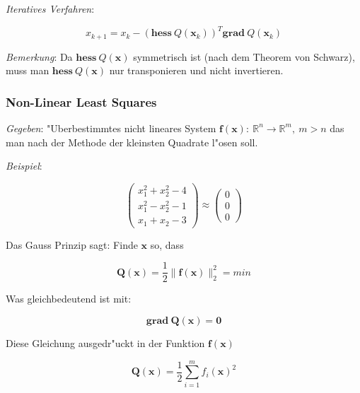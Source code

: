 \documentclass[german, 10pt, a4paper, twocolumn]{scrartcl}
\begin{document}
\textit{Iteratives Verfahren}:

\begin{displaymath}
	x_{k+1} = x_k - (\mathbf{hess}\: Q(\mathbf{x}_k))^{T}\mathbf{grad}\: Q(\mathbf{x}_k)
\end{displaymath}

\textit{Bemerkung}: Da $\mathbf{hess}\: Q(\mathbf{x})$ symmetrisch ist (nach dem Theorem von Schwarz), muss man $\mathbf{hess}\: Q(\mathbf{x})$ nur transponieren und nicht invertieren.

\subsubsection{Non-Linear Least Squares}


\textit{Gegeben}: "Uberbestimmtes nicht lineares System $\mathbf{f}(\mathbf{x}):\: \mathbb{R}^n\to\mathbb{R}^m, \: m > n$ das man nach der Methode der kleinsten Quadrate l"osen soll.

\textit{Beispiel}:

\begin{displaymath}
	\left (
	\begin{array}{c}
		x_1^2 + x_2^2 - 4 \\
		x_1^2 - x_2^2 - 1 \\
		x_1 + x_2 -3
	\end{array}
	\right ) \approx \left (
	\begin{array}{c}
		0\\
		0 \\
		0
	\end{array}
	\right )
\end{displaymath}

Das Gauss Prinzip sagt: Finde $\mathbf{x}$ so, dass

\begin{displaymath}
	\mathbf{Q}(\mathbf{x}) = \frac{1}{2} \| \mathbf{f}(\mathbf{x}) \| _2^2 = min
\end{displaymath}

Was gleichbedeutend ist mit:

\begin{displaymath}
	\mathbf{grad} \: \mathbf{Q}(\mathbf{x}) = \mathbf{0}
\end{displaymath}

Diese Gleichung ausgedr"uckt in der Funktion $\mathbf{f}(\mathbf{x})$

\begin{displaymath}
	\mathbf{Q}(\mathbf{x})=\frac{1}{2}\sum^m_{i=1} f_i(\mathbf{x})^2
\end{displaymath}
\end{document}
